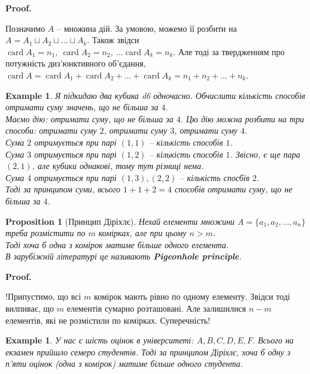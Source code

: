 \documentclass[a4paper, 14pt]{extarticle}
\makeatletter
\theoremstyle{theoremdd}
\theoremstyle{theoremdd}
\theoremstyle{theoremdd}
\theoremstyle{theoremdd}
\theoremstyle{theoremdd}
\newtheorem{example}[theorem]{Example}
\theoremstyle{theoremdd}
\theoremstyle{theoremdd}
\theoremstyle{theoremdd}
\theoremstyle{theoremdd}
\newtheorem{proposition}[theorem]{Proposition}
\theoremstyle{theoremdd}
\theoremstyle{theoremdd}
\theoremstyle{theoremdd}
\theoremstyle{theoremdd}
\theoremstyle{theoremdd}
\theoremstyle{theoremdd}
\renewenvironment{proof}[1][Proof.\\]{\par
\pushQED{\hfill \qed}%
\normalfont \topsep6\p@\@plus6\p@\relax
\trivlist
\item\relax
{\bfseries
#1\@addpunct{.}}\hspace\labelsep\ignorespaces
}{%
\popQED\endtrivlist\@endpefalse
}
\DeclareMathOperator{\card}{card}
\makeatother
\begin{document}
\begin{proof}
Позначимо $A$ -- множина дій. За умовою, можемо її розбити на $A = A_1 \sqcup A_2 \sqcup \dots \sqcup A_k$. Також звідси $\card A_1 = n_1,\ \card A_2 = n_2,\ \dots \card A_k = n_k$. Але тоді за твердженням про потужність диз'юнктивного об'єдання,\\
$\card A = \card A_1 + \card A_2 + \dots + \card A_k = n_1 + n_2 + \dots + n_k$.
\end{proof}

\begin{example}
Я підкидаю два кубика d6 одночасно. Обчислити кількість способів отримати суму значень, що не більша за $4$.\\
Маємо дію: отримати суму, що не більша за $4$. Цю дію можна розбити на три способи: отримати суму $2$, отримати суму $3$, отримати суму $4$.\\
Сума $2$ отримується при парі $(1,1)$ -- кількість способів $1$.\\
Сума $3$ отримується при парі $(1,2)$ -- кількість способів $1$. Звісно, є ще пара $(2,1)$, але кубики однакові, тому тут різниці нема.\\
Сума $4$ отримується при парі $(1,3),(2,2)$ -- кількість спосбів $2$.\\
Тоді за принципом суми, всього $1 + 1 + 2 = 4$ способів отримати суму, що не більша за $4$.
\end{example}

\begin{proposition}[Принцип Діріхлє]
Нехай елементи множини $A = \{a_1,a_2,\dots,a_n\}$ треба розмістити по $m$ комірках, але при цьому $n > m$.\\
Тоді хоча б одна з комірок матиме більше одного елемента.\\
В зарубіжній літературі це називають \textbf{Pigeonhole principle}.
\end{proposition}

\begin{proof}
!Припустимо, що всі $m$ комірок мають рівно по одному елементу. Звідси тоді вилпиває, що $m$ елементів сумарно розташовані. Але залишилися $n-m$ елементів, які не розмістили по комірках. Суперечність!
\end{proof}

\begin{example}
У нас є шість оцінок в університеті: $A,B,C,D,E,F$. Всього на екзамен прийшло семеро студентів. Тоді за принципом Діріхлє, хоча б одну з п'яти оцінок (одна з комірок) матиме більше одного студента.
\end{example}
\end{document}
